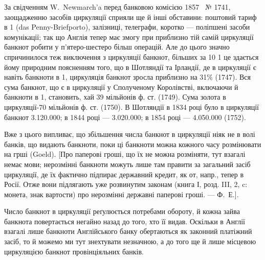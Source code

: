 За свідченням W.~Newmarch’a перед банковою комісією 1857~ № 1741,
заощадженню засобів циркуляції сприяли ще й інші обставини: поштовий тариф
в 1 (das Penny-Briefporto), залізниці, телеграфи, коротко — поліпшені засоби
комунікації; так що Англія тепер має змогу при приблизно тій самій циркуляції
банкнот робити у п’ятеро-шестеро більш операцій. Але до цього значно
спричинилося теж виключення з циркуляції банкнот, більших за 10 1 це
здається йому природним поясненням того, що в Шотляндії та Ірландії, де в
циркуляції є навіть банкноти в 1, циркуляція банкнот зросла приблизно
на 31\% (1747). Вся сума банкнот, що є в циркуляції у Сполученому Королівстві,
включаючи й банкноти в 1, становить, хай 39 мільйонів ф. ст.
(1749). Сума золота в циркуляції-70 мільйонів ф. ст. (1750). В Шотляндії
в 1834 році було в циркуляції банкнот \num{3.120.000}; в 1844 році —
\num{3.020.000}; в 1854 році — \num{4.050.000} (1752).

Вже з цього випливає, що збільшення числа банкнот в циркуляції ніяк
не в волі банків, що видають банкноти, поки ці банкноти можна кожного часу
розмінювати на грші (Goeld). [Про паперові гроші, що їх не можна розміняти,
тут взагалі немає мови; нерозмінні банкноти можуть лише там правити за загальний
засіб циркуляції, де їх фактично підпирає державний кредит, як от, напр., тепер
в Росії. Отже вони підлягають уже розвинутим законам (книга І, розд. III, 2, c:
монета, знак вартости) про нерозмінні державні паперові гроші. — Ф.~Е.].

Число банкнот в циркуляції реґулюється потребами обороту, й кожна
зайва банкнота повертається негайно назад до того, хто її видав. Оскільки в
Англії взагалі лише банкноти Англійського банку обертаються як законний
платіжний засіб, то й можемо ми тут знехтувати незначною, а до того ще й лише
місцевою циркуляцією банкнот провінціяльних банків.
